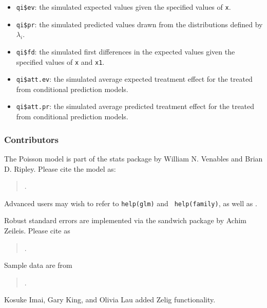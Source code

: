 \begin{itemize}
   \begin{itemize}
   \item {\tt qi\$ev}: the simulated expected values given the
     specified values of {\tt x}.
   \item {\tt qi\$pr}: the simulated predicted values drawn from the
     distributions defined by $\lambda_i$.
   \item {\tt qi\$fd}: the simulated first differences in the expected
     values given the specified values of {\tt x} and {\tt x1}.
   \item {\tt qi\$att.ev}: the simulated average expected treatment
     effect for the treated from conditional prediction models.  
   \item {\tt qi\$att.pr}: the simulated average predicted treatment
     effect for the treated from conditional prediction models.  
   \end{itemize}
\end{itemize}

\subsubsection{Contributors}

The Poisson model is part of the stats package by William N. Venables
and Brian D. Ripley.  Please cite the model as:
\begin{verse}
.
\end{verse}

Advanced users may wish to refer to {\tt help(glm)} and {\tt
  help(family)}, as well as \cite{McCNel89}.

Robust standard errors are implemented via the sandwich package
by Achim Zeileis.  Please cite as
\begin{verse}
.
\end{verse}

Sample data are from 
\begin{verse}
.  
\end{verse}

Kosuke Imai, Gary King, and Olivia Lau added Zelig functionality.  


